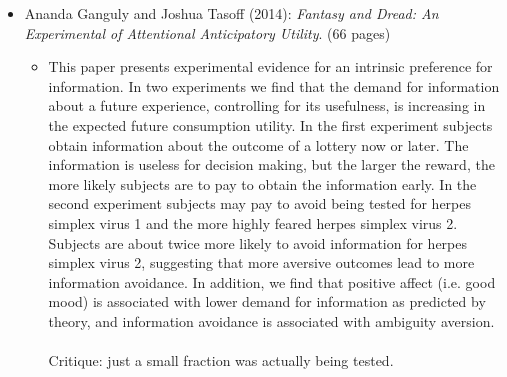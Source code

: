 \begin{itemize}
\begin{itemize}
		\end{itemize}
	\item Ananda Ganguly and Joshua Tasoff (2014): \textit{Fantasy and Dread: An Experimental of Attentional Anticipatory Utility}. (66 pages)
		\begin{itemize}
			\item This paper presents experimental evidence for an intrinsic preference for information. In two experiments we find that the demand for information about a future experience, controlling for its usefulness, is increasing in the expected future consumption utility. In the first experiment subjects obtain information about the outcome of a lottery now or later. The information is useless for decision making, but the larger the reward, the more likely subjects are to pay to obtain the information early. In the second experiment subjects may pay to avoid being tested for herpes simplex virus 1 and the more highly feared herpes simplex virus 2. Subjects are about twice more likely to avoid information for herpes simplex virus 2, suggesting that more aversive outcomes lead to more information avoidance. In addition, we find that positive affect (i.e. good mood) is associated with lower demand for information as predicted by theory, and information avoidance is associated with ambiguity aversion. \\ \\
				
				Critique: just a small fraction was actually being tested. 
		\end{itemize}
\end{itemize}


\newpage